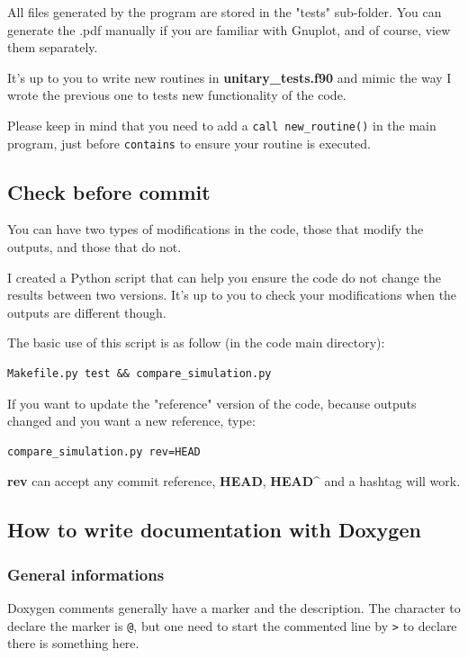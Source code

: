 \documentclass[english,a4paper,twoside]{article}
\begin{document}
All files generated by the program are stored in the "tests" sub-folder. You can generate the .pdf manually if you are familiar with Gnuplot, and of course, view them separately.

\begin{remarque}
It's up to you to write new routines in \textbf{unitary\_tests.f90} and mimic the way I wrote the previous one to tests new functionality of the code.

Please keep in mind that you need to add a \verb|call new_routine()| in the main program, just before \verb|contains| to ensure your routine is executed.
\end{remarque}

\subsection{Check before commit}\label{sec:compare_simulation}
You can have two types of modifications in the code, those that modify the outputs, and those that do not.

I created a Python script  that can help you ensure the code do not change the results between two versions. It's up to you to check your modifications when the outputs are different though.

\bigskip

The basic use of this script is as follow (in the code main directory):
\begin{verbatim}
Makefile.py test && compare_simulation.py
\end{verbatim}

\bigskip

If you want to update the "reference" version of the code, because outputs changed and you want a new reference, type:
\begin{verbatim}
compare_simulation.py rev=HEAD
\end{verbatim}
\textbf{rev} can accept any commit reference, \textbf{HEAD}, \textbf{HEAD\^} and a hashtag will work.

\subsection{How to write documentation with Doxygen}
\subsubsection{General informations}
Doxygen comments generally have a marker and the description. The character to declare the marker is \verb|@|, but one need to start the commented line by \verb|>| to declare there is something here. 
\end{document}
